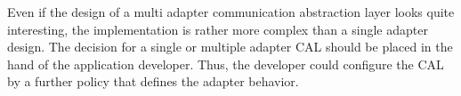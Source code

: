 

Even if the design of a multi adapter communication abstraction layer
looks quite interesting, the implementation is rather more complex
than a single adapter design. The decision for a single or multiple
adapter CAL should be placed in the hand of the application developer.
Thus, the developer could configure the CAL by a further policy that
defines the adapter behavior.


